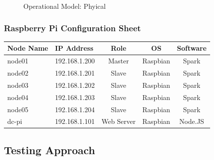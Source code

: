 \documentclass[12pt]{article} %
\begin{document}
	
	
	
		\begin{figure}[H] %
			\caption{Operational Model: Phyical}
			\label{fig:speciation}
		\end{figure}
		
	
	\subsubsection {Raspberry Pi Configuration Sheet}

	\begin{center}
		\begin{tabular}{ | p{3cm} | p{3cm} | c | c | c |}
			\hline
			\textbf {Node Name} & \textbf {IP Address} & \textbf {Role} & \textbf {OS} & \textbf {Software}  \\
			\hline
			node01 & 192.168.1.200 & Master & Raspbian & Spark\\
			\hline
			node02 & 192.168.1.201 & Slave & Raspbian & Spark\\
			\hline
			node03 & 192.168.1.202 & Slave & Raspbian & Spark\\
			\hline
			node04 & 192.168.1.203 & Slave & Raspbian & Spark\\
			\hline
			node05 & 192.168.1.204 & Slave & Raspbian & Spark\\
			\hline
			dc-pi  & 192.168.1.101 & Web Server & Raspbian & Node.JS\\
			\hline
		\end{tabular}
	\end{center}

	\subsection{Testing Approach}
	
\end{document}
